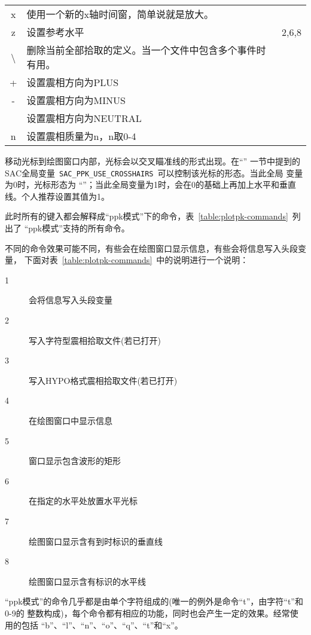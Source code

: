 \begin{table}[H]
\begin{tabular}{cll}
    x	    &	使用一个新的x轴时间窗，简单说就是放大。 &           \\
    z	    &	设置参考水平                            &   2,6,8	\\
    \textbackslash	    &	删除当前全部拾取的定义。当一个文件中包含多个事件时有用。&	\\
    +	    &	设置震相方向为PLUS	                    &           \\
    -	    &	设置震相方向为MINUS	                    &           \\
    \lstinline[showspaces]{ }   &	设置震相方向为NEUTRAL	                &           \\
    n	    &	设置震相质量为n，n取0-4	                &           \\
	\bottomrule
\end{tabular}
\end{table}

移动光标到绘图窗口内部，光标会以交叉瞄准线的形式出现。在``''
一节中提到的SAC全局变量~\verb+SAC_PPK_USE_CROSSHAIRS+~可以控制该光标的形态。当此全局
变量为0时，光标形态为
``''；当此全局变量为1时，会在0的基础上再加上水平和垂直线。个人推荐设置其值为1。

此时所有的键入都会解释成``ppk模式''下的命令，表~\ref{table:plotpk-commands}~列出了
``ppk模式''支持的所有命令。

不同的命令效果可能不同，有些会在绘图窗口显示信息，有些会将信息写入头段变量，
下面对表~\ref{table:plotpk-commands}~中的说明进行一个说明：
\begin{description}
    \item [1] 会将信息写入头段变量
    \item [2] 写入字符型震相拾取文件(若已打开)
    \item [3] 写入HYPO格式震相拾取文件(若已打开)
    \item [4] 在绘图窗口中显示信息
    \item [5] 窗口显示包含波形的矩形
    \item [6] 在指定的水平处放置水平光标
    \item [7] 绘图窗口显示含有到时标识的垂直线
    \item [8] 绘图窗口显示含有标识的水平线
\end{description}

``ppk模式''的命令几乎都是由单个字符组成的(唯一的例外是命令``t''，由字符``t''和0-9的
整数构成)，每个命令都有相应的功能，同时也会产生一定的效果。经常使用的包括
``b''、``l''、``n''、``o''、``q''、``t''和``x''。

